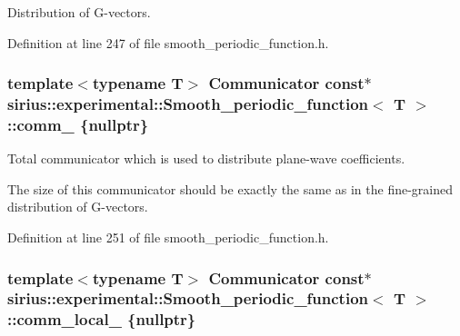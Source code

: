 Distribution of G-\/vectors. 



Definition at line 247 of file smooth\+\_\+periodic\+\_\+function.\+h.

\hypertarget{classsirius_1_1experimental_1_1_smooth__periodic__function_a5925101182e8599a99871c991b9cc1ba}{}
\subsubsection[{comm\+\_\+}]{\setlength{\rightskip}{0pt plus 5cm}template$<$typename T$>$ Communicator const$\ast$ {\bf sirius\+::experimental\+::\+Smooth\+\_\+periodic\+\_\+function}$<$ T $>$\+::comm\+\_\+ \{nullptr\}\hspace{0.3cm}{\ttfamily [protected]}}\label{classsirius_1_1experimental_1_1_smooth__periodic__function_a5925101182e8599a99871c991b9cc1ba}


Total communicator which is used to distribute plane-\/wave coefficients. 

The size of this communicator should be exactly the same as in the fine-\/grained distribution of G-\/vectors. 

Definition at line 251 of file smooth\+\_\+periodic\+\_\+function.\+h.

\hypertarget{classsirius_1_1experimental_1_1_smooth__periodic__function_a656ece802c6021543350b9b6b523b57b}{}
\subsubsection[{comm\+\_\+local\+\_\+}]{\setlength{\rightskip}{0pt plus 5cm}template$<$typename T$>$ Communicator const$\ast$ {\bf sirius\+::experimental\+::\+Smooth\+\_\+periodic\+\_\+function}$<$ T $>$\+::comm\+\_\+local\+\_\+ \{nullptr\}\hspace{0.3cm}{\ttfamily [protected]}}\label{classsirius_1_1experimental_1_1_smooth__periodic__function_a656ece802c6021543350b9b6b523b57b}



